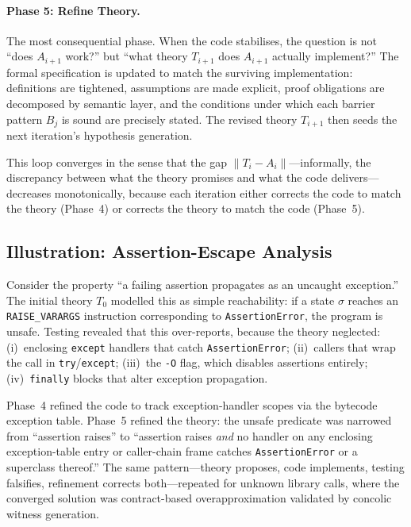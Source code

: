\paragraph{Phase 5: Refine Theory.}
The most consequential phase.
When the code stabilises, the question is not ``does $A_{i+1}$ work?'' but ``what theory $T_{i+1}$ does $A_{i+1}$ actually implement?''
The formal specification is updated to match the surviving implementation: definitions are tightened, assumptions are made explicit, proof obligations are decomposed by semantic layer, and the conditions under which each barrier pattern $B_j$ is sound are precisely stated.
The revised theory $T_{i+1}$ then seeds the next iteration's hypothesis generation.

This loop converges in the sense that the gap $\|T_i - A_i\|$---informally, the discrepancy between what the theory promises and what the code delivers---decreases monotonically, because each iteration either corrects the code to match the theory (Phase~4) or corrects the theory to match the code (Phase~5).

\subsection{Illustration: Assertion-Escape Analysis}

Consider the property ``a failing assertion propagates as an uncaught exception.''
The initial theory $T_0$ modelled this as simple reachability: if a state $\sigma$ reaches an \texttt{RAISE\_VARARGS} instruction corresponding to \texttt{AssertionError}, the program is unsafe.
Testing revealed that this over-reports, because the theory neglected:
(i)~enclosing \texttt{except} handlers that catch \texttt{AssertionError};
(ii)~callers that wrap the call in \texttt{try}/\texttt{except};
(iii)~the \texttt{-O} flag, which disables assertions entirely;
(iv)~\texttt{finally} blocks that alter exception propagation.

Phase~4 refined the code to track exception-handler scopes via the bytecode exception table.
Phase~5 refined the theory: the unsafe predicate was narrowed from ``assertion raises'' to ``assertion raises \emph{and} no handler on any enclosing exception-table entry or caller-chain frame catches \texttt{AssertionError} or a superclass thereof.''
The same pattern---theory proposes, code implements, testing falsifies, refinement corrects both---repeated for unknown library calls, where the converged solution was contract-based overapproximation validated by concolic witness generation.

